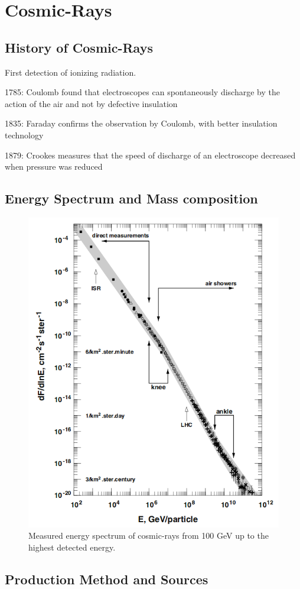\chapter{Cosmic-Rays}\label{Ch:Cosmic-rays}

\section{History of Cosmic-Rays}

First detection of ionizing radiation. 

1785: Coulomb found that 
electroscopes can spontaneously 
discharge by the action of the air 
and not by defective insulation

1835: Faraday confirms the 
observation by Coulomb, with 
better insulation technology

1879: Crookes measures that the 
speed of discharge of an 
electroscope decreased when 
pressure was reduced 

\section{Energy Spectrum and Mass composition}

\begin{figure}[hp]
\centering
\includegraphics[width=\textwidth]{chapters/pix/CosmicRay_Spectrum.png}
\caption{Measured energy spectrum of cosmic-rays from 100 GeV up to the highest detected energy.}
\label{fig:CR_Spectrum}
\end{figure}

\section{Production Method and Sources}